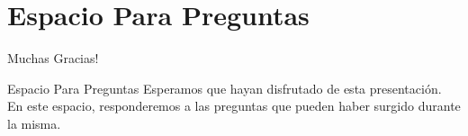 \section{Espacio Para Preguntas}

\begin{frame}{Muchas Gracias!}
\begin{block}{Espacio Para Preguntas}
Esperamos que hayan disfrutado de esta presentación. En este espacio, responderemos a las preguntas que pueden haber surgido durante la misma.
\end{block}
\end{frame}